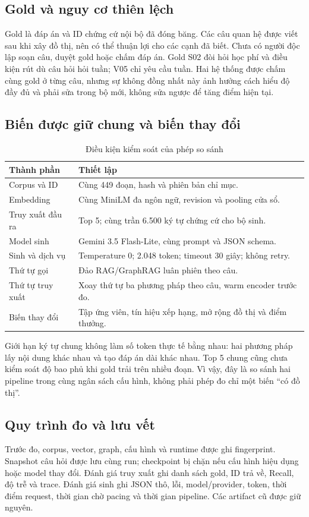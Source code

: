 \subsection{Gold và nguy cơ thiên lệch}
Gold là đáp án và ID chứng cứ nội bộ đã đóng băng. Các câu quan hệ được viết sau khi xây đồ thị, nên có thể thuận lợi cho các cạnh đã biết. Chưa có người độc lập soạn câu, duyệt gold hoặc chấm đáp án. Gold S02 đòi hỏi học phí và điều kiện rút dù câu hỏi hỏi tuần; V05 chỉ yêu cầu tuần. Hai hệ thống được chấm cùng gold ở từng câu, nhưng sự không đồng nhất này ảnh hưởng cách hiểu độ đầy đủ và phải sửa trong bộ mới, không sửa ngược để tăng điểm hiện tại.

\subsection{Biến được giữ chung và biến thay đổi}
\begin{table}[H]
\centering\small
\caption{Điều kiện kiểm soát của phép so sánh}
\begin{tabularx}{\textwidth}{l X}
\toprule Thành phần & Thiết lập\\
\midrule
Corpus và ID & Cùng 449 đoạn, hash và phiên bản chỉ mục.\\
Embedding & Cùng MiniLM đa ngôn ngữ, revision và pooling cửa sổ.\\
Truy xuất đầu ra & Top 5; cùng trần 6.500 ký tự chứng cứ cho bộ sinh.\\
Model sinh & Gemini 3.5 Flash-Lite, cùng prompt và JSON schema.\\
Sinh và dịch vụ & Temperature 0; 2.048 token; timeout 30 giây; không retry.\\
Thứ tự gọi & Đảo RAG/GraphRAG luân phiên theo câu.\\
Thứ tự truy xuất & Xoay thứ tự ba phương pháp theo câu, warm encoder trước đo.\\
Biến thay đổi & Tập ứng viên, tín hiệu xếp hạng, mở rộng đồ thị và điểm thưởng.\\
\bottomrule
\end{tabularx}
\end{table}

Giới hạn ký tự chung không làm số token thực tế bằng nhau: hai phương pháp lấy nội dung khác nhau và tạo đáp án dài khác nhau. Top 5 chung cũng chưa kiểm soát độ bao phủ khi gold trải trên nhiều đoạn. Vì vậy, đây là so sánh hai pipeline trong cùng ngân sách cấu hình, không phải phép đo chỉ một biến ``có đồ thị''.

\subsection{Quy trình đo và lưu vết}
Trước đo, corpus, vector, graph, cấu hình và runtime được ghi fingerprint. Snapshot câu hỏi được lưu cùng run; checkpoint bị chặn nếu cấu hình hiệu dụng hoặc model thay đổi. Đánh giá truy xuất ghi danh sách gold, ID trả về, Recall, độ trễ và trace. Đánh giá sinh ghi JSON thô, lỗi, model/provider, token, thời điểm request, thời gian chờ pacing và thời gian pipeline. Các artifact cũ được giữ nguyên.

